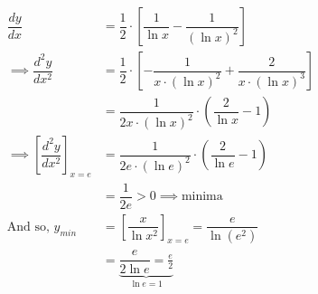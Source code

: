 \documentclass[14pt,fleqn]{extarticle}
\begin{document}
\begin{problem}
\begin{step}
	
        \begin{align}
          \dfrac{dy}{dx} &= \dfrac{1}{2}\cdot \left[\dfrac{1}{\ln x}-\dfrac{1}{(\ln x)^2}\right]\\
          \implies\dfrac{d^2 y}{dx^2} &= \dfrac{1}{2}\cdot 
          \left[-\dfrac{1}{x\cdot (\ln x)^2} + \dfrac{2}{x\cdot (\ln x)^3}\right] \\
          &= \dfrac{1}{2x\cdot (\ln x)^2}\cdot \left(\dfrac{2}{\ln x} - 1 \right) \\
          \implies \left[\dfrac{d^2 y}{dx^2}\right]_{x=e} &= 
          \dfrac{1}{2e\cdot (\ln e)^2}\cdot \left(\dfrac{2}{\ln e} - 1\right) \\
          &= \dfrac{1}{2e}> 0\implies \text{minima} \\
          \text{And so, }y_{min} &= \left[\dfrac{x}{\ln x^2}\right]_{x=e} = 
          \dfrac{e}{\ln \left(e^2 \right)} \\
          &= \underbrace{\dfrac{e}{2\ln e} = \frac{e}{2}}_{\ln e = 1 }
        \end{align}
        
\end{step}
\end{problem}
\end{document}
